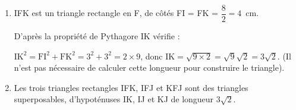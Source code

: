 \begin{enumerate}
\item %
IFK est un triangle rectangle en F, de côtés FI = FK = $\dfrac{8}{2} = 4$~cm.

D'après la propriété de Pythagore IK vérifie :

$\text{IK}^2 = \text{FI}^2 + \text{FK}^2 = 3^2 + 3^2 = 2 \times 9$, donc $\text{IK} = \sqrt{9 \times 2} = \sqrt{9}\sqrt{2} = 3\sqrt{2}$. (Il n'est pas nécessaire de calculer cette longueur pour construire le triangle).
\item %

%
%
Les trois triangles rectangles IFK, IFJ et KFJ sont des triangles superposables, d'hypoténuses IK, IJ et KJ de longueur $3\sqrt{2}$.


\end{enumerate}
